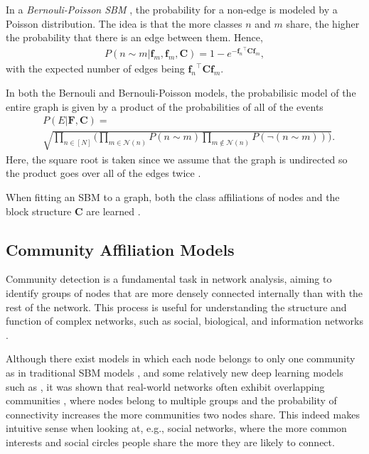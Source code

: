 \documentclass[letterpaper]{article} %
\newcommand{\ron}[1]{{{\textcolor{red}{\textbf{[Ron:} {#1}\textbf{]}}}}}
\begin{document}
In a \emph{Bernouli-Poisson SBM} \cite{yang2013BigClam,zhou2015bernoullipoisson, shchur2019overlapping}, the probability for a non-edge is modeled by a Poisson distribution. The idea is that the more classes $n$ and $m$ share, the higher the probability that there is an edge between them.  Hence,
\begin{align}
\label{eqn:ber_poi}    
P(n\sim m|\mathbf{f}_m,\mathbf{f}_m,\mathbf{C}) =1 - e^{-{\mathbf{f}_n}^\top  \mathbf{C} \mathbf{f}_m}, 
\end{align}
with the expected number of edges being ${\mathbf{f}_n}^\top  \mathbf{C} \mathbf{f}_m$.

In both the Bernouli and Bernouli-Poisson models, the probabilisic model of the entire graph is given by a product of the probabilities of all of the events
\smallskip
\begin{align*}
\label{eqn:prob_prod}
    & P(E|\mathbf{F},\mathbf{C}) = \\ & \sqrt{\underset{n \in [N]} {\prod}\Big(\underset{m\in \mathcal{N}(n)}{\prod}P(n \sim m)\underset{m \notin \mathcal{N}(n)}{\prod} P(\neg(n \sim m))\Big)}.
\end{align*}
Here, the square root is taken since we assume that the graph is undirected so the product goes over all of the edges twice \cite{aicher2015wsbm,morup2011infinite}. 

When fitting an SBM to a graph, both the class affiliations of nodes and the block structure $\mathbf{C}$ are learned %
\cite{snijders1997sbm_estimation1,nowicki2001sbm_estimation2,latouche2012variational_sbm_estimation}.


\subsection{Community Affiliation Models}

Community detection is a fundamental task in network analysis, aiming to identify groups of nodes that are more densely connected internally than with the rest of the network. This process is useful for understanding the structure and function of complex networks, such as social, biological, and information networks \cite{fortunato2016community}.

Although there exist models in which each node belongs to only one community as in traditional SBM models \cite{holland1983stochastic}, and some relatively new deep learning models such as \cite{cavallari2017learning},
it was shown that real-world networks often exhibit overlapping communities \cite{yang2014structure,yang2013BigClam}, where nodes belong to multiple groups and the probability of connectivity increases the more communities two nodes share. This indeed makes intuitive sense when looking at, e.g., social networks, where the more common interests and social circles people share the more they are likely to connect.  
\end{document}
